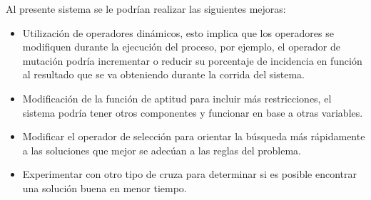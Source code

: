 \documentclass[pdftex,a4paper,10.5pt]{article}
\begin{document}
Al presente sistema se le podrían realizar las siguientes mejoras:

\begin{itemize}

\item  Utilizaci\'on de operadores din\'amicos, esto implica que los operadores se modifiquen durante
la ejecuci\'on del proceso, por ejemplo, el operador de mutaci\'on podr\'ia incrementar o reducir
su porcentaje de incidencia en función al resultado que se va obteniendo durante la corrida
del sistema.
\item Modificaci\'on de la funci\'on de aptitud para incluir m\'as restricciones, el sistema podr\'ia tener otros componentes y funcionar en base a otras variables. 
\item Modificar el operador de selecci\'on para orientar la b\'usqueda m\'as r\'apidamente a las soluciones que mejor se adec\'uan a las reglas del problema.
\item Experimentar con otro tipo de cruza para determinar si es posible encontrar una soluci\'on buena en menor tiempo.

\end{itemize}
\newpage
\end{document}
